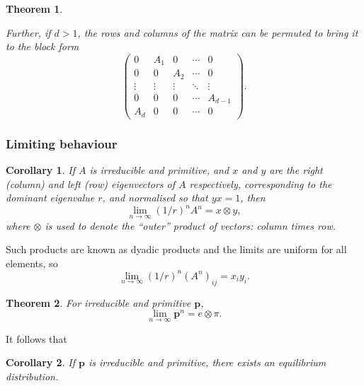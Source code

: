 \documentclass{article}
\newtheorem{theorem}{Theorem}
\newtheorem{corollary}{Corollary}
\begin{document}
\begin{theorem}
\begin{enumerate}
        Further, if $d>1$, the rows and columns of the matrix can be permuted to bring it to the block form
        \begin{equation}
            \begin{pmatrix}
                0 & A_1 & 0 & \cdots & 0 \\
                0 & 0 & A_2 & \cdots & 0 \\
                \vdots & \vdots & \vdots & \ddots & \vdots \\
                0 & 0 & 0 & \cdots & A_{d-1} \\
                A_d & 0 & 0 & \cdots & 0
            \end{pmatrix}. \nonumber
        \end{equation}
    \end{enumerate}
\end{theorem}

\subsubsection{Limiting behaviour}
\begin{corollary}
    If $A$ is irreducible and primitive, and $x$ and $y$ are the right (column) and left (row) eigenvectors of $A$ respectively, corresponding to the dominant eigenvalue $r$, and normalised so that $yx=1$, then
    \begin{equation}
        \lim_{n\to\infty}(1/r)^n A^n = x \otimes y,
    \end{equation}
    where $\otimes$ is used to denote the ``outer'' product of vectors: column times row.
\end{corollary}
Such products are known as dyadic products and the limits are uniform for all elements, so 
\begin{equation}
    \lim_{n\to\infty}(1/r)^n(A^n)_{ij} =x_i y_i. \nonumber
\end{equation}
\begin{theorem}
    For irreducible and primitive $\mathbf{p}$,
    \begin{equation}
        \lim_{n\to\infty}\mathbf{p}^n = e\otimes \pi. 
    \end{equation}
\end{theorem}
It follows that
\begin{corollary}
    If $\mathbf{p}$ is irreducible and primitive, there exists an equilibrium distribution.
\end{corollary}
\end{document}
